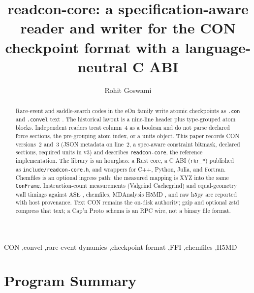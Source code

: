 \documentclass[preprint,12pt]{elsarticle}
\begin{document}
\begin{frontmatter}

\title{readcon-core: a specification-aware reader and writer for the CON
checkpoint format with a language-neutral C ABI}

\author[ui]{Rohit Goswami}

\begin{abstract}
Rare-event and saddle-search codes in the eOn family write atomic
checkpoints as \texttt{.con} and \texttt{.convel} text
\cite{chillEONSoftwareLong2014}. The historical layout is a nine-line
header plus type-grouped atom blocks. Independent readers treat
column~4 as a boolean and do not parse declared force sections, the
pre-grouping atom index, or a units object. This paper records CON
versions~2 and~3 (JSON metadata on line~2, a spec-aware constraint
bitmask, declared sections, required units in v3) and describes
\texttt{readcon-core}, the reference implementation. The library is an
hourglass: a Rust core, a C ABI (\texttt{rkr\_*}) published as
\texttt{include/readcon-core.h}, and wrappers for C++, Python, Julia,
and Fortran. Chemfiles
\cite{frauxChemfiles2023} is an optional ingress path; the measured
mapping is XYZ into the same \texttt{ConFrame}. Instruction-count
measurements (Valgrind Cachegrind) and equal-geometry wall timings
against ASE \cite{larsenAtomicSimulationEnvironment2017}, chemfiles,
MDAnalysis H5MD
\cite{michaudAgrawalMDAnalysisToolkit2011,gowersMDAnalysisPythonPackage2016},
and raw h5py are reported with host provenance. Text CON remains the
on-disk authority; gzip and optional zstd compress that text; a
Cap'n Proto schema is an RPC wire, not a binary file format.
\end{abstract}

\begin{keyword}
CON \sep convel \sep rare-event dynamics \sep checkpoint format
\sep FFI \sep chemfiles \sep H5MD
\end{keyword}

\end{frontmatter}

\section*{Program Summary}
\end{document}
